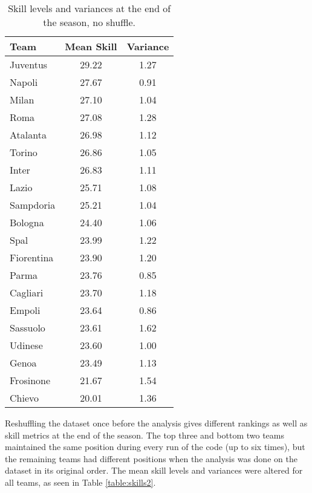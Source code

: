 \begin{table}[h!]
\centering
\begin{tabular}{|l|c|c|}
\hline
\textbf{Team} & \textbf{Mean Skill} & \textbf{Variance} \\
\hline
Juventus & 29.22 & 1.27 \\
Napoli & 27.67 & 0.91 \\
Milan & 27.10 & 1.04 \\
Roma & 27.08 & 1.28 \\
Atalanta & 26.98 & 1.12 \\
Torino & 26.86 & 1.05 \\
Inter & 26.83 & 1.11 \\
Lazio & 25.71 & 1.08 \\
Sampdoria & 25.21 & 1.04 \\
Bologna & 24.40 & 1.06 \\
Spal & 23.99 & 1.22 \\
Fiorentina & 23.90 & 1.20 \\
Parma & 23.76 & 0.85 \\
Cagliari & 23.70 & 1.18 \\
Empoli & 23.64 & 0.86 \\
Sassuolo & 23.61 & 1.62 \\
Udinese & 23.60 & 1.00 \\
Genoa & 23.49 & 1.13 \\
Frosinone & 21.67 & 1.54 \\
Chievo & 20.01 & 1.36 \\
\hline
\end{tabular}
\caption{Skill levels and variances at the end of the season, no shuffle.}
\label{table:skills1}
\end{table}

Reshuffling the dataset once before the analysis gives different rankings as well as skill metrics at the end of the season. The top three and bottom two teams maintained the same position during every run of the code (up to six times), but the remaining teams had different positions when the analysis was done on the dataset in its original order. The mean skill levels and variances were altered for all teams, as seen in Table \ref{table:skills2}.

